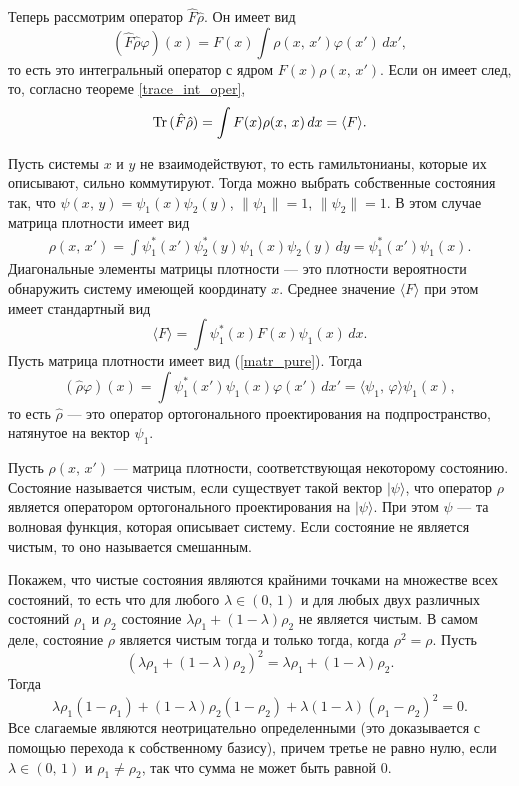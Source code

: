 \documentclass[a4paper
]{article}
\begin{document}
Теперь рассмотрим оператор $\hat F\hat \rho$. Он имеет вид
$$(\hat F\hat \rho\varphi)(x)=F(x)\int \rho(x, \, x')\varphi(x')\, dx',$$
то есть это интегральный оператор с ядром $F(x)\rho(x, \, x')$. Если
он имеет след, то, согласно теореме \ref{trace_int_oper},
$${\rm Tr}\, (\hat F\hat \rho)=\int F(x)\rho(x, \, x)\, dx=\langle
F\rangle.$$ \par
Пусть системы $x$ и $y$ не взаимодействуют, то есть гамильтонианы,
которые их описывают, сильно коммутируют. Тогда можно выбрать собственные
состояния так, что $\psi(x, \, y)=\psi_1(x)\psi_2(y)$, $\|\psi_1\|=1$,
$\|\psi_2\|=1$. В этом случае матрица плотности имеет вид
\begin{align}
\label{matr_pure}
\rho(x, \, x')=\int \psi_1^*(x')\psi_2^*(y)\psi_1(x)\psi_2(y)\, dy=
\psi_1^*(x')\psi_1(x).
\end{align}
Диагональные элементы матрицы плотности --- это плотности вероятности
обнаружить систему имеющей координату $x$. Среднее значение $\langle F
\rangle$ при этом имеет стандартный вид $$\langle F\rangle=\int \psi_1^*
(x)F(x)\psi_1(x)\, dx.$$ Пусть матрица плотности имеет вид (\ref{matr_pure}).
Тогда $$(\hat\rho\varphi)(x)=\int \psi_1^*(x')\psi_1(x)\varphi(x')\, dx'=
\langle \psi_1, \, \varphi\rangle\psi_1(x),$$ то есть $\hat\rho$ ---
это оператор ортогонального проектирования на подпространство, натянутое на
вектор $\psi_1$.
\begin{Def}
Пусть $\rho(x, \, x')$ --- матрица плотности, соответствующая некоторому
состоянию. Состояние называется чистым, если существует такой вектор
$|\psi\rangle $, что оператор $\rho$ является оператором ортогонального
проектирования на $|\psi\rangle$. При этом $\psi$ --- та волновая функция,
которая описывает систему. Если состояние не является чистым, то оно
называется смешанным.
\end{Def}
Покажем, что чистые состояния являются крайними точками на множестве всех
состояний, то есть что для любого $\lambda\in (0, \, 1)$ и для любых
двух различных состояний $\rho_1$ и $\rho_2$ состояние $\lambda
\rho_1+(1-\lambda)\rho_2$ не является чистым. В самом деле, состояние
$\rho$ является чистым тогда и только тогда, когда $\rho^2=\rho$.
Пусть $$\left(\lambda\rho_1+(1-\lambda)\rho_2\right)^2=\lambda\rho_1
+(1-\lambda)\rho_2.$$ Тогда $$\lambda \rho_1(1-\rho_1)+(1-\lambda)
\rho_2(1-\rho_2)+\lambda(1-\lambda)(\rho_1-\rho_2)^2=0.$$ Все
слагаемые являются неотрицательно определенными (это доказывается
с помощью перехода к собственному базису), причем третье
не равно нулю, если $\lambda\in (0, \, 1)$
и $\rho_1\ne \rho_2$, так что сумма не может быть равной 0. \par
\end{document}
